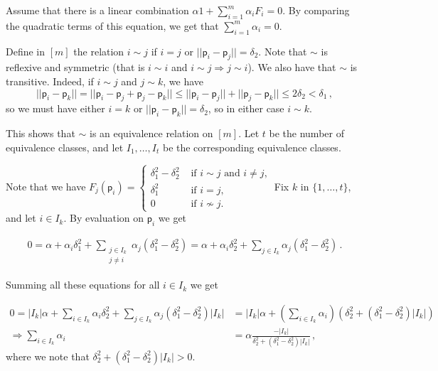 \documentclass[kulak]{tplt}
\theoremstyle{definition}
\newcommand{\vp}{\mathsf{p}}
\begin{document}
\begin{enumerate}
\begin{enumerate}
Assume that there is a linear combination $\alpha 1 + \sum_{i=1}^m \alpha_i F_i = 0 $.
By comparing the quadratic terms of this equation, we get that $\sum_{i=1}^m \alpha_i = 0$.

Define in $[m]$ the relation $i\sim j $ if $i=j$ or $||\vp_i - \vp_j || = \delta_2$.
Note that $\sim $ is reflexive and symmetric (that is $i\sim i$ and $i\sim j \Rightarrow j \sim i$).
We also have that $\sim $ is transitive.
Indeed, if $i\sim j$ and $j \sim k$, we have 
$$||\vp_i - \vp_k ||  = || \vp_i - \vp_j + \vp_j - \vp_k||  \leq ||\vp_i - \vp_j || + ||\vp_j - \vp_k|| \leq 2\delta_2 < \delta_1 \, , $$
so we must have either $i=k$ or $||\vp_i - \vp_k|| = \delta_2$, so in either case $i \sim k$.

This shows that $\sim $ is an equivalence relation on $[m]$.
Let $t$ be the number of equivalence classes, and let $I_1, \ldots, I_t $ be the corresponding equivalence classes.

Note that we have 
$F_j(\vp_i) = \begin{cases} \delta_1^2 - \delta_2^2& \text{ if $i\sim j$ and $i\neq j$,} \\ \delta_1^2& \text{ if $i = j$,}\\ 0& \text{ if $i \not\sim j$.} \end{cases}$
Fix $k$ in $\{1, \ldots, t \}$, and let $i \in I_k$.
By evaluation on $\vp_i$ we get

\begin{equation}\label{eq:eq_1}
\begin{split}
0 = \alpha + \alpha_i \delta_1^2 + \sum_{\substack{j\in I_k \\ j \neq i}} \alpha_j (\delta_1^2-\delta_2^2) = \alpha + \alpha_i \delta_2^2 + \sum_{j\in I_k } \alpha_j (\delta_1^2-\delta_2^2)\, . 
\end{split}
\end{equation}

Summing all these equations for all $i\in I_k$ we get

\begin{equation}\label{eq:eq_2}
\begin{split}
0 = |I_k|\alpha + \sum_{i\in I_k} \alpha_i \delta_2^2 + \sum_{j\in I_k } \alpha_j (\delta_1^2-\delta_2^2)|I_k| &= |I_k|\alpha + \left( \sum_{i\in I_k} \alpha_i \right) \left( \delta_2^2 + (\delta_1^2-\delta_2^2)|I_k|  \right) \\
\Rightarrow \sum_{i \in I_k} \alpha_i &= \alpha \frac{-|I_k|}{\delta_2^2 + (\delta_1^2-\delta_2^2)|I_k|} \, ,
\end{split}
\end{equation}
where we note that $\delta_2^2 + (\delta_1^2-\delta_2^2)|I_k| > 0 $.


\end{enumerate}
\end{enumerate}
\end{document}
